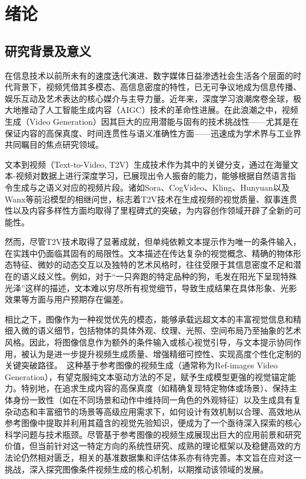 \cleardoublepage
\section{绪论}
\subsection{研究背景及意义}
在信息技术以前所未有的速度迭代演进、数字媒体日益渗透社会生活各个层面的时代背景下，视频凭借其多模态、高信息密度的特性，已无可争议地成为信息传播、娱乐互动及艺术表达的核心媒介与主导力量。近年来，深度学习浪潮席卷全球，极大地推动了人工智能生成内容（AIGC）技术的革命性进展。在此浪潮之中，视频生成（Video Generation）因其巨大的应用潜能与固有的技术挑战性——尤其是在保证内容的高保真度、时间连贯性与语义准确性方面——迅速成为学术界与工业界共同瞩目的焦点研究领域。

文本到视频（Text-to-Video, T2V）生成技术作为其中的关键分支，通过在海量文本-视频对数据上进行深度学习，已展现出令人振奋的能力，能够根据自然语言指令生成与之语义对应的视频片段。诸如Sora\cite{liu2024sora}、CogVideo\cite{yang2024cogvideox}、Kling\cite{kuaishou2024klingai}、Hunyuan\cite{sun2024hunyuan}以及Wanx\cite{wan2025}等前沿模型的相继问世，标志着T2V技术在生成视频的视觉质量、叙事连贯性以及内容多样性方面均取得了里程碑式的突破\cite{blattmann2023stable,singer2022make,blattmann2023align}，为内容创作领域开辟了全新的可能性。

然而，尽管T2V技术取得了显著成就，但单纯依赖文本提示作为唯一的条件输入，在实践中仍面临其固有的局限性。文本描述在传达复杂的视觉概念、精确的物体形态特征、微妙的动态交互以及独特的艺术风格时，往往受限于其信息密度不足和潜在的语义歧义性。例如，对于“一只奔跑的特定品种的狗，毛发在阳光下呈现特殊光泽”这样的描述，文本难以穷尽所有视觉细节，导致生成结果在具体形象、光影效果等方面与用户预期存在偏差。

相比之下，图像作为一种视觉优先的模态，能够承载远超文本的丰富视觉信息和精细入微的语义细节，包括物体的具体外观、纹理、光照、空间布局乃至抽象的艺术风格。因此，将图像信息作为额外的条件输入或核心视觉引导，与文本提示协同作用，被认为是进一步提升视频生成质量、增强精细可控性、实现高度个性化定制的关键突破路径。\
这种基于参考图像的视频生成（通常称为Ref-images Video Generation），有望克服纯文本驱动方法的不足，赋予生成模型更强的视觉锚定能力。特别地，在追求生成内容的高保真度（如精确复现特定物体或场景）、保持主体身份一致性（如在不同场景和动作中维持同一角色的外观特征）以及生成具有复杂动态和丰富细节的场景等高级应用需求下，如何设计有效机制以合理、高效地从参考图像中提取并利用其蕴含的视觉先验知识，便成为了一个亟待深入探索的核心科学问题与技术瓶颈。尽管基于参考图像的视频生成展现出巨大的应用前景和研究价值，但当前针对这一特定方向的系统性研究、成熟的理论框架以及稳健高效的方法论仍然相对匮乏，相关的基准数据集和评估体系亦有待完善。本文旨在应对这一挑战，深入探究图像条件视频生成的核心机制，以期推动该领域的发展。

